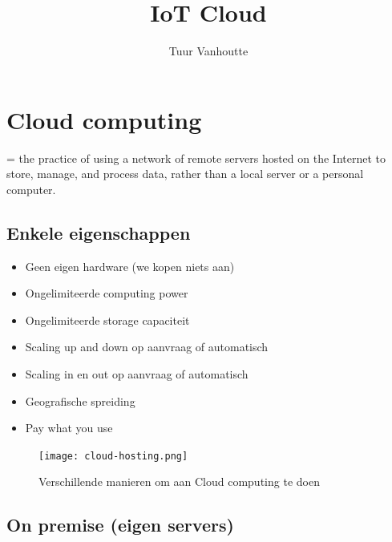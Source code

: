 \documentclass{article}
\begin{document}
\begin{titlepage}
    \author{Tuur Vanhoutte}
    \title{IoT Cloud}
\end{titlepage}

\maketitle
\newpage
\tableofcontents
\newpage


\section{Cloud computing}

= the practice of using a network of remote servers hosted on the Internet to store, manage, and process data, rather than a local server or a personal computer.

\subsection{Enkele eigenschappen}
\begin{itemize}
    \item Geen eigen hardware (we kopen niets aan)
    \item Ongelimiteerde computing power
    \item Ongelimiteerde storage capaciteit
    \item Scaling up and down op aanvraag of automatisch
    \item Scaling in en out op aanvraag of automatisch
    \item Geografische spreiding
    \item Pay what you use
\end{itemize}

\begin{figure}[H]
    \centering
    \texttt{[image: cloud-hosting.png]}
    \caption{Verschillende manieren om aan Cloud computing te doen}
\end{figure}


\subsection{On premise (eigen servers)}
\end{document}

